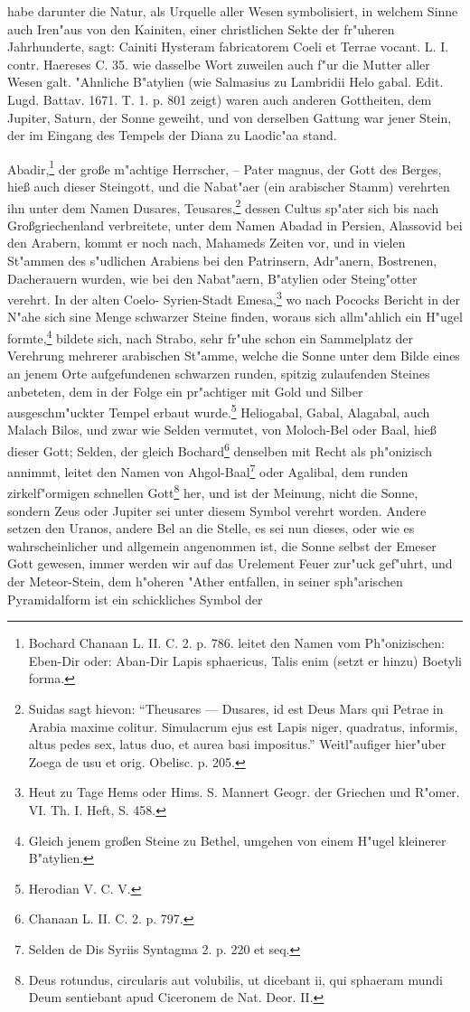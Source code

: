 \documentclass[a4paper, 11pt, oneside, polutonikogreek, german]{article}
\begin{document}
habe darunter die Natur, als Urquelle aller Wesen symbolisiert, in welchem Sinne auch Iren"aus von den Kainiten, einer christlichen Sekte der fr"uheren Jahrhunderte, sagt: Cainiti Hysteram fabricatorem Coeli et Terrae vocant. L. I. contr. Haereses C. 35. wie dasselbe Wort zuweilen auch f"ur die Mutter aller Wesen galt. "Ahnliche B"atylien (wie Salmasius zu Lambridii Helo gabal. Edit. Lugd. Battav. 1671. T. 1. p. 801 zeigt) waren auch anderen Gottheiten, dem Jupiter, Saturn, der Sonne geweiht, und von derselben Gattung war jener Stein, der im Eingang des Tempels der Diana zu Laodic"aa stand.

Abadir,\footnote{Bochard Chanaan L. II. C. 2. p. 786. leitet den Namen vom Ph"onizischen: Eben-Dir oder: Aban-Dir Lapis sphaericus, Talis enim (setzt er hinzu) Boetyli forma.} der große m"achtige Herrscher, -- Pater magnus, der Gott des Berges, hieß auch dieser Steingott, und die Nabat"aer (ein arabischer Stamm) verehrten ihn unter dem Namen Dusares, Teusares,\footnote{Suidas sagt hievon: "`Theusares --- Dusares, id est Deus Mars qui Petrae in Arabia maxime colitur. Simulacrum ejus est Lapis niger, quadratus, informis, altus pedes sex, latus duo, et aurea basi impositus."' Weitl"aufiger hier"uber Zoega de usu et orig. Obelisc. p. 205.} dessen Cultus sp"ater sich bis nach Großgriechenland verbreitete, unter dem Namen Abadad in Persien, Alassovid bei den Arabern, kommt er noch nach, Mahameds Zeiten vor, und in vielen St"ammen des s"udlichen Arabiens bei den Patrinsern, Adr"anern, Bostrenen, Dacherauern wurden, wie bei den Nabat"aern, B"atylien oder Steing"otter verehrt. In der alten Coelo- Syrien-Stadt Emesa,\footnote{Heut zu Tage Hems oder Hims. S. Mannert Geogr. der Griechen und R"omer. VI. Th. I. Heft, S. 458.} wo nach Pococks Bericht in der N"ahe sich sine Menge schwarzer Steine finden, woraus sich allm"ahlich ein H"ugel formte,\footnote{Gleich jenem großen Steine zu Bethel, umgehen von einem H"ugel kleinerer B"atylien.} bildete sich, nach Strabo, sehr fr"uhe schon ein Sammelplatz der Verehrung mehrerer arabischen St"amme, welche die Sonne unter dem Bilde eines an jenem Orte aufgefundenen schwarzen runden, spitzig zulaufenden Steines anbeteten, dem in der Folge ein pr"achtiger mit Gold und Silber ausgeschm"uckter Tempel erbaut wurde.\footnote{Herodian V. C. V.} Heliogabal, Gabal, Alagabal, auch Malach Bilos, und zwar wie Selden vermutet, von Moloch-Bel oder Baal, hieß dieser Gott; Selden, der gleich Bochard\footnote{Chanaan L. II. C. 2. p. 797.} denselben mit Recht als ph"onizisch annimmt, leitet den Namen von Ahgol-Baal\footnote{Selden de Dis Syriis Syntagma 2. p. 220 et seq.} oder Agalibal, dem runden zirkelf"ormigen schnellen Gott\footnote{Deus rotundus, circularis aut volubilis, ut dicebant ii, qui sphaeram mundi Deum sentiebant apud Ciceronem de Nat. Deor. II.} her, und ist der Meinung, nicht die Sonne, sondern Zeus oder Jupiter sei unter diesem Symbol verehrt worden. Andere setzen den Uranos, andere Bel an die Stelle, es sei nun dieses, oder wie es wahrscheinlicher und allgemein angenommen ist, die Sonne selbst der Emeser Gott gewesen, immer werden wir auf das Urelement Feuer zur"uck gef"uhrt, und der Meteor-Stein, dem h"oheren "Ather entfallen, in seiner sph"arischen Pyramidalform ist ein schickliches Symbol der 
\end{document}
